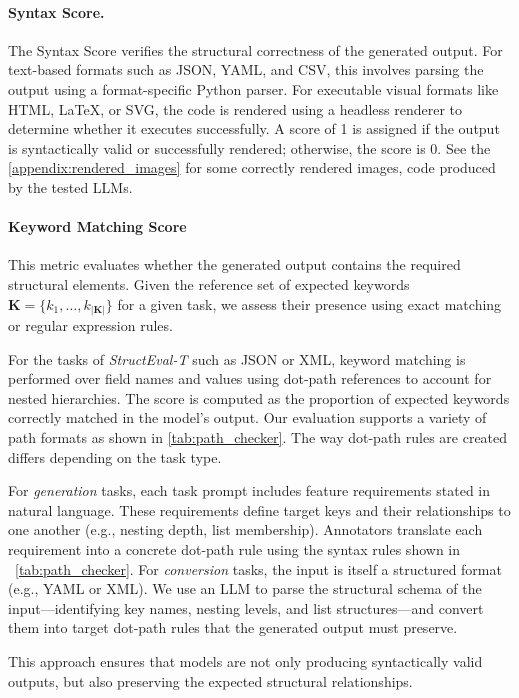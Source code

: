 


\paragraph{Syntax Score.}
The Syntax Score verifies the structural correctness of the generated output. For text-based formats such as JSON, YAML, and CSV, this involves parsing the output using a format-specific Python parser. For executable visual formats like HTML, LaTeX, or SVG, the code is rendered using a headless renderer to determine whether it executes successfully. A score of 1 is assigned if the output is syntactically valid or successfully rendered; otherwise, the score is 0. See the \autoref{appendix:rendered_images} for some correctly rendered images, code produced by the tested LLMs. 

\paragraph{Keyword Matching Score}
This metric evaluates whether the generated output contains the required structural elements. Given the reference set of expected keywords $\mathbf{K} = \{k_1, \dots, k_{|\mathbf{K}|}\}$ for a given task, we assess their presence using exact matching or regular expression rules. 

For the tasks of \emph{StructEval-T} such as JSON or XML, keyword matching is performed over field names and values using dot-path references to account for nested hierarchies. The score is computed as the proportion of expected keywords correctly matched in the model’s output. Our evaluation supports a variety of path formats as shown in \autoref{tab:path_checker}. The way dot-path rules are created differs depending on the task type. 

For \textit{generation} tasks, each task prompt includes feature requirements stated in natural language. These requirements define target keys and their relationships to one another (e.g., nesting depth, list membership). Annotators translate each requirement into a concrete dot-path rule using the syntax rules shown in ~\autoref{tab:path_checker}. For \textit{conversion} tasks, the input is itself a structured format (e.g., YAML or XML). We use an LLM to parse the structural schema of the input—identifying key names, nesting levels, and list structures—and convert them into target dot-path rules that the generated output must preserve.

This approach ensures that models are not only producing syntactically valid outputs, but also preserving the expected structural relationships. 

